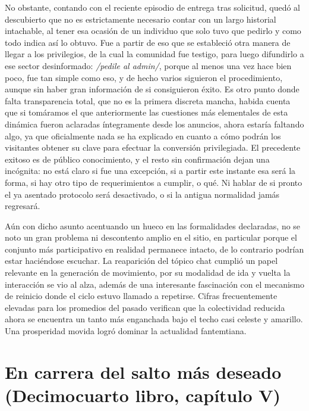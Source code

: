 \documentclass[
]{book}
\begin{document}
No obstante, contando con el reciente episodio de entrega tras solicitud, quedó al descubierto que no es estrictamente necesario contar con un largo historial intachable, al tener esa ocasión de un individuo que solo tuvo que pedirlo y como todo indica así lo obtuvo. Fue a partir de eso que se estableció otra manera de llegar a los privilegios, de la cual la comunidad fue testigo, para luego difundirlo a ese sector desinformado: \emph{/pedile al admin/}, porque al menos una vez hace bien poco, fue tan simple como eso, y de hecho varios siguieron el procedimiento, aunque sin haber gran información de si consiguieron éxito. Es otro punto donde falta transparencia total, que no es la primera discreta mancha, habida cuenta que si tomáramos el que anteriormente las cuestiones más elementales de esta dinámica fueron aclaradas íntegramente desde los anuncios, ahora estaría faltando algo, ya que oficialmente nada se ha explicado en cuanto a cómo podrán los visitantes obtener su clave para efectuar la conversión privilegiada. El precedente exitoso es de público conocimiento, y el resto sin confirmación dejan una incógnita: no está claro si fue una excepción, si a partir este instante esa será la forma, si hay otro tipo de requerimientos a cumplir, o qué. Ni hablar de si pronto el ya asentado protocolo será desactivado, o si la antigua normalidad jamás regresará.

Aún con dicho asunto acentuando un hueco en las formalidades declaradas, no se noto un gran problema ni descontento amplio en el sitio, en particular porque el conjunto más participativo en realidad permanece intacto, de lo contrario podrían estar haciéndose escuchar. La reaparición del tópico chat cumplió un papel relevante en la generación de movimiento, por su modalidad de ida y vuelta la interacción se vio al alza, además de una interesante fascinación con el mecanismo de reinicio donde el ciclo estuvo llamado a repetirse. Cifras frecuentemente elevadas para los promedios del pasado verifican que la colectividad reducida ahora se encuentra un tanto más enganchada bajo el techo casi celeste y amarillo. Una prosperidad movida logró dominar la actualidad fantemtiana.

\hypertarget{en-carrera-del-salto-muxe1s-deseado-decimocuarto-libro-capuxedtulo-v}{%
\section{En carrera del salto más deseado (Decimocuarto libro, capítulo V)}\label{en-carrera-del-salto-muxe1s-deseado-decimocuarto-libro-capuxedtulo-v}}
\end{document}
